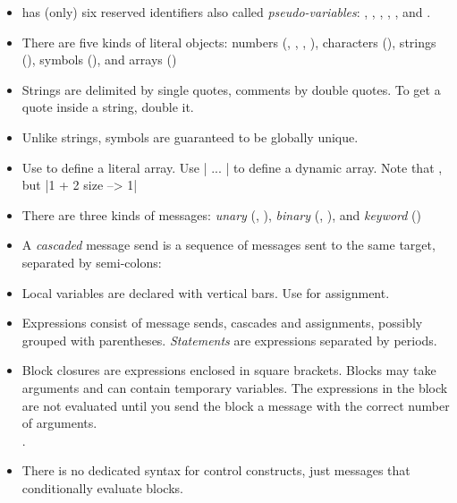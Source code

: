 \documentclass[a4paper,10pt,twoside]{book}
\begin{document}
\begin{itemize}

\item	\sq has (only) six reserved identifiers also called \textit{pseudo-variables}:
		, , , , , and .

\item	There are five kinds of literal objects:
		numbers (, , , ), characters (), strings (), symbols (), and arrays ()

\item	Strings are delimited by single quotes, comments by double quotes.
		To get a quote inside a string, double it.

\item	Unlike strings, symbols are guaranteed to be globally unique.

\item	Use  to define a literal array.
		Use \ct|{ ... }| to define a dynamic array.
		Note that 
		, but 
		\ct|{1 + 2} size --> 1|

\item	There are three kinds of messages:
		\emph{unary} (\eg {}, ),
		\emph{binary} (\eg {}, ), and
		\emph{keyword} (\eg {})

\item	A \emph{cascaded} message send is a sequence of messages sent to the same target, separated by semi-colons:

\item	Local variables are declared with vertical bars.
		Use \ct{:=} for assignment.

\item	Expressions consist of message sends, cascades and assignments, possibly grouped with parentheses.
		\emph{Statements} are expressions separated by periods.

\item	Block closures are expressions enclosed in square brackets.
		Blocks may take arguments and can contain temporary variables.
		The expressions in the block are not evaluated until you send the block a 
		 message with the correct number of arguments.\\
		.

\item	There is no dedicated syntax for control constructs, just messages that conditionally evaluate blocks.\\

\end{itemize}

\ifx\wholebook\relax\else
\end{document}
